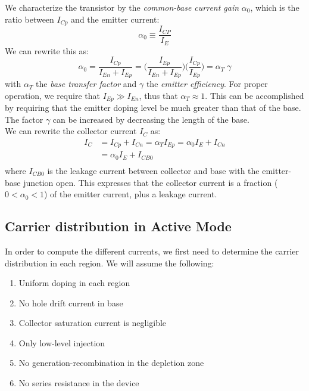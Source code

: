 We characterize the transistor by the \emph{common-base current gain} $\alpha_0$, which is the ratio between $I_{Cp}$ and the emitter current:
$$
\alpha_0 \equiv \frac{I_{CP}}{I_E}
$$
We can rewrite this as:
$$
\alpha_0 = \frac{I_{Cp}}{I_{En} + I_{Ep}} = \Big(\frac{I_{Ep}}{I_{En} + I_{Ep}}\Big)  \Big(\frac{I_{Cp}}{I_{Ep}}\Big) = \alpha_T \; \gamma
$$
with $\alpha_T $ the \emph{base transfer factor} and $\gamma$ the \emph{emitter efficiency}. For proper operation, we require that $I_{Ep} \gg I_{En}$, thus that $\alpha_T \approx 1$. This can be accomplished by requiring that the emitter doping level be much greater than that of the base. The factor $\gamma$ can be increased by decreasing the length of the base.\\
We can rewrite the collector current $I_C$ as:
\begin{equation}
    \begin{split}
        I_C &= I_{Cp} + I_{Cn} = \alpha_T I_{Ep} = \alpha_0 I_E + I_{Cn} \\
            &= \alpha_0 I_E + I_{CB0} \\
    \end{split}
    \label{eq:bjt1}
\end{equation}
where $I_{CB0} $ is the leakage current between collector and base with the emitter-base junction open. This expresses that the collector current is a fraction ($0 < \alpha_0 < 1$) of the emitter current, plus a leakage current.

\subsection{Carrier distribution in Active Mode}
In order to compute the different currents, we first need to determine the carrier distribution in each region. We will assume the following:
\begin{enumerate}
    \item Uniform doping in each region
    \item No hole drift current in base
    \item Collector saturation current is negligible
    \item Only low-level injection
    \item No generation-recombination in the depletion zone
    \item No series resistance in the device
\end{enumerate}

